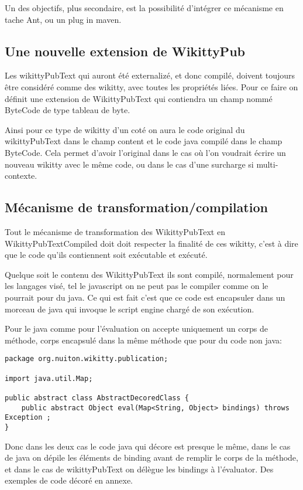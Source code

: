 Un des objectifs, plus secondaire, est la possibilité d'intégrer ce mécanisme
en tache Ant, ou un plug in maven.

\subsection{Une nouvelle extension de WikittyPub}

Les wikittyPubText qui auront été externalizé, et donc compilé, doivent toujours 
être considéré comme des wikitty, avec toutes les propriétés liées. Pour ce 
faire on définit une extension de WikittyPubText qui contiendra un champ nommé 
ByteCode de type tableau de byte.

Ainsi pour ce type de wikitty d'un coté on aura le code original du 
wikittyPubText dans le champ content et le code java compilé dans le champ
ByteCode. Cela permet d'avoir l'original dans le cas où l'on voudrait écrire
un nouveau wikitty avec le même code, ou dans le cas d'une surcharge si 
multi-contexte.

\subsection{Mécanisme de transformation/compilation}

Tout le mécanisme de transformation des WikittyPubText en WikittyPubTextCompiled
doit doit respecter la finalité de ces wikitty, c'est à dire que le code qu'ils
contiennent soit exécutable et exécuté. 

Quelque soit le contenu des WikittyPubText ils sont compilé, normalement pour les
langages visé, tel le javascript on ne peut pas le compiler comme on le pourrait 
pour du java. Ce qui est fait c'est que ce code est encapsuler dans un morceau
de java qui invoque le script engine chargé de son exécution. 

Pour le java comme pour l'évaluation on accepte uniquement un corps de méthode,
corps encapsulé dans la même méthode que pour du code non java:


\begin{lstlisting}
package org.nuiton.wikitty.publication;

import java.util.Map;

public abstract class AbstractDecoredClass {
    public abstract Object eval(Map<String, Object> bindings) throws Exception ;
}
\end{lstlisting}

Donc dans les deux cas le code java qui décore est presque le même, dans le 
cas de java on dépile les éléments de binding avant de remplir le corps de la 
méthode, et dans le cas de wikittyPubText on délègue les bindings à l'évaluator.
Des exemples de code décoré en annexe.

